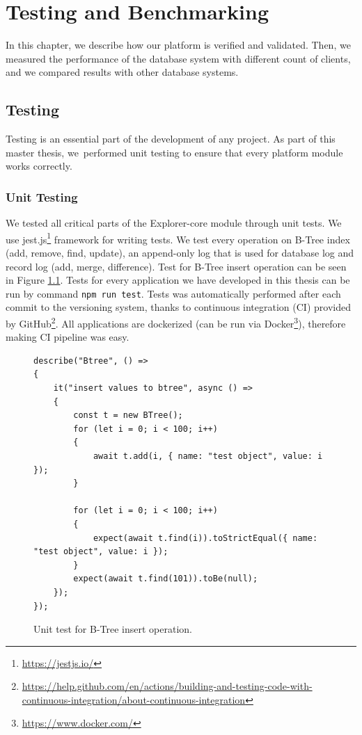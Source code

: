 \chapter{Testing and Benchmarking}
In this chapter, we describe how our platform is verified and validated. Then, we measured the performance of the database system with different count of clients, and we compared results with other database systems. 


\section{Testing}
Testing is an essential part of the development of any project. As part of this master thesis, we~performed unit testing to ensure that every platform module works correctly.

\subsection{Unit Testing}
We tested all critical parts of the Explorer-core module through unit tests. We use jest.js\footnote{\url{https://jestjs.io/}} framework for writing tests. We test every operation on B-Tree index (add, remove, find, update), an append-only log that is used for database log and record log (add, merge, difference). Test for B-Tree insert operation can be seen in Figure \ref{unitTest}. Tests for every application we have developed in this thesis can be run by command \texttt{npm run test}. Tests was automatically performed after each commit to the versioning system, thanks to  continuous integration (CI) provided by GitHub\footnote{\url{https://help.github.com/en/actions/building-and-testing-code-with-continuous-integration/about-continuous-integration}}. All applications are dockerized (can be run via Docker\footnote{\url{https://www.docker.com/}}), therefore making CI pipeline was easy.

\begin{figure}[h]
    \centering
    \begin{lstlisting}[style=ES6]
describe("Btree", () =>
{
    it("insert values to btree", async () =>
    {
        const t = new BTree();
        for (let i = 0; i < 100; i++)
        {
            await t.add(i, { name: "test object", value: i });
        }

        for (let i = 0; i < 100; i++)
        {
            expect(await t.find(i)).toStrictEqual({ name: "test object", value: i });
        }
        expect(await t.find(101)).toBe(null);
    });
});
    \end{lstlisting}
    \caption{Unit test for B-Tree insert operation.}
    \label{unitTest}
\end{figure}




